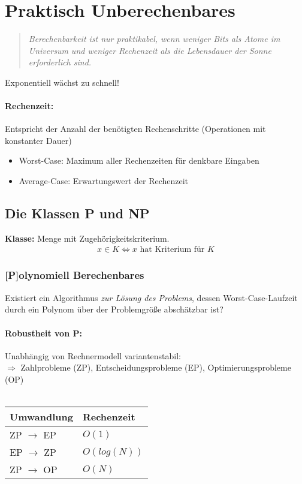 \documentclass{article}
\begin{document}
\section{Praktisch Unberechenbares}
\begin{quote}
    \emph{
        Berechenbarkeit ist nur praktikabel, wenn weniger Bits als Atome im Universum und weniger Rechenzeit als die Lebensdauer der Sonne erforderlich sind.
    }
\end{quote}
\Rightarrow Exponentiell w\"achst zu schnell!
\paragraph*{Rechenzeit:}
Entspricht der Anzahl der benötigten Rechenschritte (Operationen mit konstanter Dauer)
\begin{itemize}
    \item Worst-Case: Maximum aller Rechenzeiten für denkbare Eingaben
    \item Average-Case: Erwartungswert der Rechenzeit
\end{itemize}


\subsection{Die Klassen P und NP}
\textbf{Klasse:} Menge mit Zugehörigkeitskriterium.
\begin{align}
    x \in K \Leftrightarrow x \text{ hat Kriterium für } K 
\end{align}
\subsubsection{[P]olynomiell Berechenbares}
Existiert ein Algorithmus \emph{zur Lösung des Problems}, dessen Worst-Case-Laufzeit durch ein Polynom über der Problemgröße abschätzbar ist?
\paragraph*{Robustheit von P:}
Unabhängig von Rechnermodell variantenstabil:\\
$\Rightarrow$ Zahlprobleme (ZP), Entscheidungsprobleme (EP), Optimierungsprobleme (OP)\\\\
\begin{tabular}{l | l}
    Umwandlung          & Rechenzeit  \\ \hline
    ZP $\rightarrow$ EP & $O(1)$      \\
    EP $\rightarrow$ ZP & $O(log(N))$ \\
    ZP $\rightarrow$ OP & $O(N)$
\end{tabular}
\end{document}
